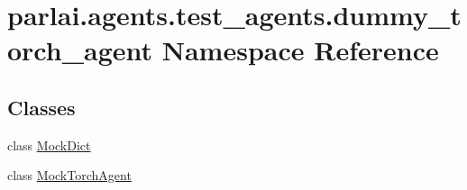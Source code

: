 \hypertarget{namespaceparlai_1_1agents_1_1test__agents_1_1dummy__torch__agent}{}\section{parlai.\+agents.\+test\+\_\+agents.\+dummy\+\_\+torch\+\_\+agent Namespace Reference}
\label{namespaceparlai_1_1agents_1_1test__agents_1_1dummy__torch__agent}
\subsection*{Classes}
\begin{DoxyCompactItemize}
\item 
class \hyperlink{classparlai_1_1agents_1_1test__agents_1_1dummy__torch__agent_1_1MockDict}{Mock\+Dict}
\item 
class \hyperlink{classparlai_1_1agents_1_1test__agents_1_1dummy__torch__agent_1_1MockTorchAgent}{Mock\+Torch\+Agent}
\end{DoxyCompactItemize}
